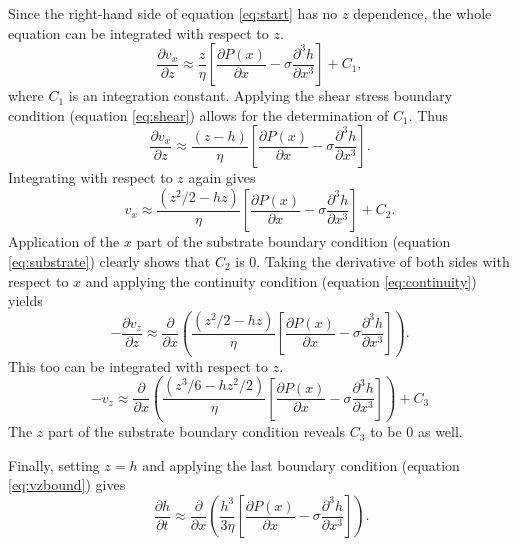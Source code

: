 \documentclass[twocolumn,showpacs,preprintnumbers,amsmath,amssymb]{revtex4}
\begin{document}
Since the right-hand side of equation \ref{eq:start} has no $z$
dependence, the whole equation can be integrated with respect to $z$.
\begin{equation}
\frac{\partial v_x}{\partial z}  \approx \frac{z}{\eta}\left[\frac{\partial
P(x)}{\partial x}-\sigma\frac{\partial^3 h}{\partial x^3}\right]+C_1 \mathrm{,}
\end{equation}
where $C_1$ is an integration constant. Applying the shear stress
boundary condition (equation \ref{eq:shear}) allows for the
determination of $C_1$. Thus
\begin{equation}
\frac{\partial v_x}{\partial z} \approx \frac{\left(z-h\right)}{\eta}\left[\frac{\partial
P(x)}{\partial x}-\sigma\frac{\partial^3 h}{\partial x^3}\right] \mathrm{.}
\end{equation}
Integrating with respect to $z$ again gives
\begin{equation}
v_x \approx \frac{\left(z^2/2-hz\right)}{\eta}\left[\frac{\partial P(x)}{\partial
x}-\sigma\frac{\partial^3 h}{\partial x^3}\right]+C_2 \mathrm{.}
\end{equation}
Application of the $x$ part of the substrate boundary condition
(equation \ref{eq:substrate}) clearly shows that $C_2$ is 0. Taking
the derivative of both sides with respect to $x$ and applying the
continuity condition (equation \ref{eq:continuity}) yields
\begin{equation}
-\frac{\partial v_z}{\partial z}  \approx \frac{\partial}{\partial x}
\left(\frac{\left(z^2/2-hz\right)}{\eta}\left[\frac{\partial P(x)}{\partial
x}-\sigma\frac{\partial^3 h}{\partial x^3}\right]\right) \mathrm{.}
\end{equation}
This too can be integrated with respect to $z$.
\begin{equation}
-v_z \approx \frac{\partial}{\partial
x}\left(\frac{\left(z^3/6-hz^2/2\right)}{\eta}\left[\frac{\partial P(x)}{\partial
x}-\sigma\frac{\partial^3 h}{\partial x^3}\right]\right)+C_3 \label{eq:almost}
\end{equation}
The $z$ part of the substrate boundary condition reveals $C_3$ to be $0$ as well.

Finally, setting $z = h$ and applying the last boundary condition (equation
\ref{eq:vzbound}) gives
\begin{equation}\
\frac{\partial h}{\partial t} \approx \frac{\partial}{\partial
x}\left(\frac{h^3}{3\eta}\left[\frac{\partial P(x)}{\partial x}-\sigma\frac{\partial^3
h}{\partial x^3}\right]\right) \mathrm{.} \label{eq:last}
\end{equation}
\end{document}

